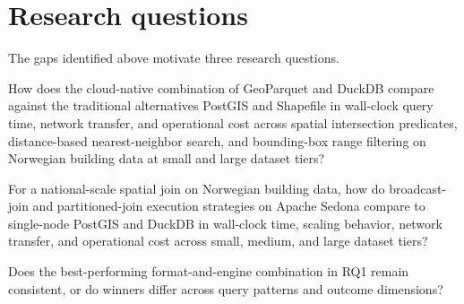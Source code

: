 \section{Research questions}
\label{related-work:research-questions}
The gaps identified above motivate three research questions.
\begin{description}[font=\normalfont\bfseries, align=left, labelindent=0pt, labelwidth=2.8em, labelsep=0.7em, leftmargin=3.5em, itemsep=0.5em, topsep=0.4em]
    \item[RQ1:] How does the cloud-native combination of GeoParquet and DuckDB compare against the traditional alternatives PostGIS and Shapefile in wall-clock query time, network transfer, and operational cost across spatial intersection predicates, distance-based nearest-neighbor search, and bounding-box range filtering on Norwegian building data at small and large dataset tiers?
    \item[RQ2:] For a national-scale spatial join on Norwegian building data, how do broadcast-join and partitioned-join execution strategies on Apache Sedona compare to single-node PostGIS and DuckDB in wall-clock time, scaling behavior, network transfer, and operational cost across small, medium, and large dataset tiers?
    \item[RQ3:] Does the best-performing format-and-engine combination in RQ1 remain consistent, or do winners differ across query patterns and outcome dimensions?
\end{description}
